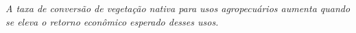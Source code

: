 \noindent\emph{A taxa de conversão de vegetação nativa para usos agropecuários aumenta quando se eleva o retorno econômico esperado desses usos.}

%
%
%



%
%

